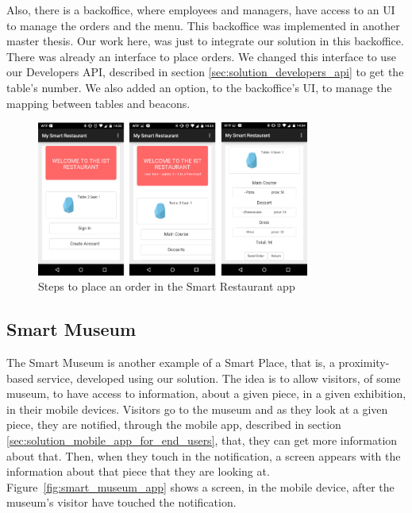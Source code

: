 Also, there is a backoffice, where employees and managers, have access to an \gls{UI} to manage the orders and the menu.
This backoffice was implemented in another master thesis\cite{SLOC}.
Our work here, was just to integrate our solution in this backoffice.
There was already an interface to place orders.
We changed this interface to use our Developers \gls{API}, described in section \ref{sec:solution_developers_api} to get the table's number.
We also added an option, to the backoffice's \gls{UI}, to manage the mapping between tables and beacons.

\begin{figure}[!ht]
  \centering
    \includegraphics[width=0.8\textwidth, keepaspectratio]{images/screenshots/smart_restaurant_app}
    \caption[Smart Restaurant]{Steps to place an order in the Smart Restaurant app}
    \label{fig:smart_restaurant_app}
\end{figure}

\subsection{Smart Museum}
\label{sub:smart_museum}
The Smart Museum is another example of a Smart Place, that is, a proximity-based service, developed using our solution.
The idea is to allow visitors, of some museum, to have access to information, about a given piece, in a given exhibition, in their mobile devices.
Visitors go to the museum and as they look at a given piece, they are notified, through the mobile app, described in section \ref{sec:solution_mobile_app_for_end_users}, that, they can get more information about that.
Then, when they touch in the notification, a screen appears with the information about that piece that they are looking at.
Figure~\ref{fig:smart_museum_app} shows a screen, in the mobile device, after the museum's visitor have touched the notification.

